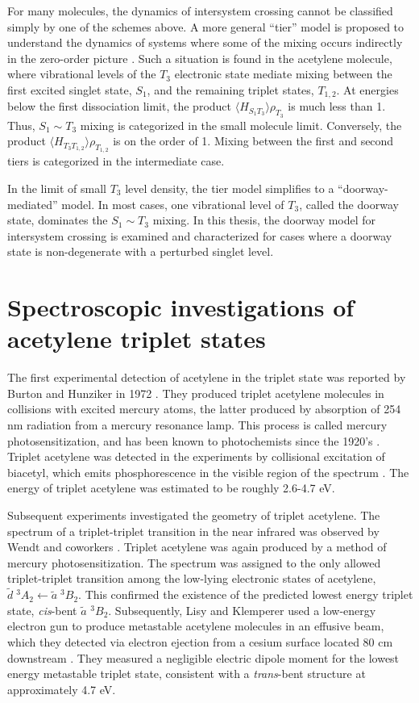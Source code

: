 \documentclass[12pt]{mitthesis}
\begin{document}
For many molecules, the dynamics of intersystem crossing cannot be
classified simply by one of the schemes above.  A more general
``tier'' model is proposed to understand the dynamics of systems where
some of the mixing occurs indirectly in the zero-order picture
\cite{stuchebrukhov93a, stuchebrukhov93b}.  Such a situation is found
in the acetylene molecule, where vibrational levels of the $T_3$
electronic state mediate mixing between the first excited singlet
state, $S_1$, and the remaining triplet states, $T_{1,2}$.  At
energies below the first dissociation limit, the product $\langle
H_{S_1 T_3} \rangle \rho_{T_3}$ is much less than 1.  Thus, $S_1 \sim
T_3$ mixing is categorized in the small molecule limit.  Conversely,
the product $\langle H_{T_3 T_{1,2}} \rangle \rho_{T_{1,2}}$ is on the
order of 1.  Mixing between the first and second tiers is categorized
in the intermediate case.

In the limit of small $T_3$ level density, the tier model simplifies
to a ``doorway-mediated'' model.  In most cases, one vibrational level
of $T_3$, called the doorway state, dominates the $S_1 \sim T_3$
mixing.  In this thesis, the doorway model for intersystem crossing is
examined and characterized for cases where a doorway state is
non-degenerate with a perturbed singlet level.

\section{Spectroscopic investigations of acetylene triplet states}

The first experimental detection of acetylene in the triplet state was
reported by Burton and Hunziker in 1972 \cite{burton72}.  They
produced triplet acetylene molecules in collisions with excited mercury
atoms, the latter produced by absorption of 254 nm radiation from a
mercury resonance lamp.  This process is called mercury
photosensitization, and has been known to photochemists since the
1920's \cite{calvert66, cairo22}.  Triplet acetylene was detected in
the experiments by collisional excitation of biacetyl, which emits
phosphorescence in the visible region of the spectrum \cite{burton72}.
The energy of triplet acetylene was estimated to be roughly 2.6-4.7
eV.

Subsequent experiments investigated the geometry of triplet acetylene.
The spectrum of a triplet-triplet transition in the near
infrared was observed by Wendt and coworkers \cite{wendt79}.  Triplet
acetylene was again produced by a method of mercury
photosensitization.  The spectrum was assigned to the only allowed
triplet-triplet transition among the low-lying electronic states of
acetylene, $\tilde{d} \; ^3A_2 \leftarrow \tilde{a} \; ^3B_2$.  This
confirmed the existence of the predicted lowest energy triplet state,
\emph{cis}-bent $\tilde{a}$ $^3B_2$.  Subsequently, Lisy and Klemperer
used a low-energy electron gun to produce metastable acetylene
molecules in an effusive beam, which they detected via electron
ejection from a cesium surface located 80 cm downstream \cite{lisy80,
  hemminger76}.  They measured a negligible electric dipole moment for
the lowest energy metastable triplet state, consistent with a
\emph{trans}-bent structure at approximately 4.7 eV.
\end{document}
